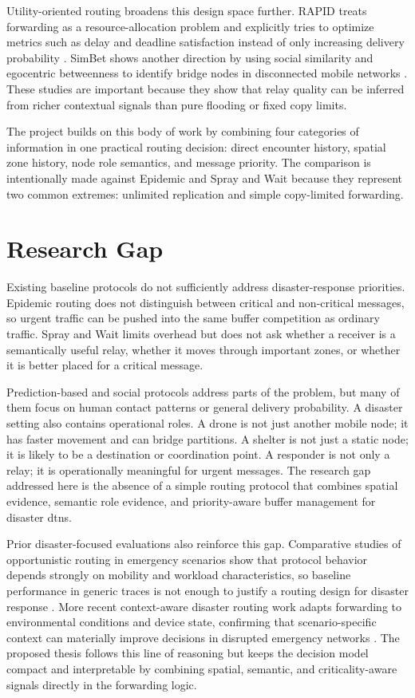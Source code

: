 Utility-oriented routing broadens this design space further. RAPID treats forwarding as a resource-allocation problem and explicitly tries to optimize metrics such as delay and deadline satisfaction instead of only increasing delivery probability \citep{balasubramanian2007rapid}. SimBet shows another direction by using social similarity and egocentric betweenness to identify bridge nodes in disconnected mobile networks \citep{daly2007simbet}. These studies are important because they show that relay quality can be inferred from richer contextual signals than pure flooding or fixed copy limits.

The project builds on this body of work by combining four categories of information in one practical routing decision: direct encounter history, spatial zone history, node role semantics, and message priority. The comparison is intentionally made against Epidemic and Spray and Wait because they represent two common extremes: unlimited replication and simple copy-limited forwarding.

\section{Research Gap}
Existing baseline protocols do not sufficiently address disaster-response priorities. Epidemic routing does not distinguish between critical and non-critical messages, so urgent traffic can be pushed into the same buffer competition as ordinary traffic. Spray and Wait limits overhead but does not ask whether a receiver is a semantically useful relay, whether it moves through important zones, or whether it is better placed for a critical message.

Prediction-based and social protocols address parts of the problem, but many of them focus on human contact patterns or general delivery probability. A disaster setting also contains operational roles. A drone is not just another mobile node; it has faster movement and can bridge partitions. A shelter is not just a static node; it is likely to be a destination or coordination point. A responder is not only a relay; it is operationally meaningful for urgent messages. The research gap addressed here is the absence of a simple routing protocol that combines spatial evidence, semantic role evidence, and priority-aware buffer management for disaster \acp{dtn}.

Prior disaster-focused evaluations also reinforce this gap. Comparative studies of opportunistic routing in emergency scenarios show that protocol behavior depends strongly on mobility and workload characteristics, so baseline performance in generic traces is not enough to justify a routing design for disaster response \citep{martincampillo2013disaster}. More recent context-aware disaster routing work adapts forwarding to environmental conditions and device state, confirming that scenario-specific context can materially improve decisions in disrupted emergency networks \citep{rosasolivos2020csar}. The proposed thesis follows this line of reasoning but keeps the decision model compact and interpretable by combining spatial, semantic, and criticality-aware signals directly in the forwarding logic.

